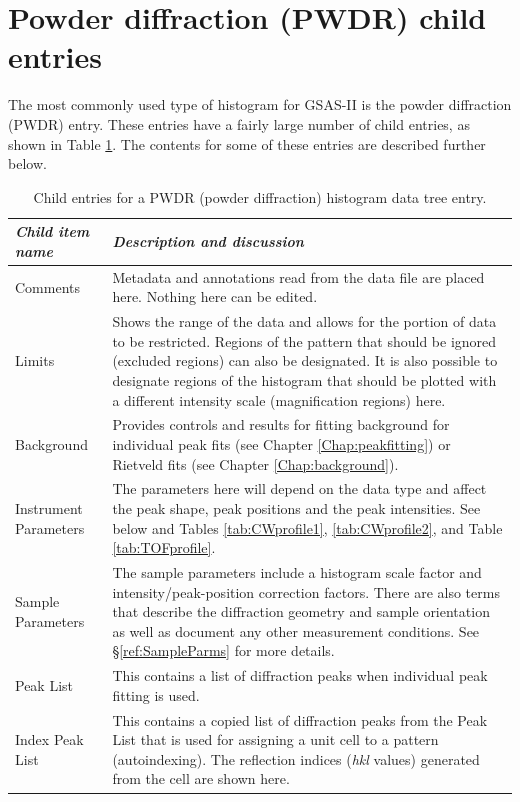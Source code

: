 \clearpage
\section{Powder diffraction (PWDR) child entries}
\label{ref:PWDRchild}
The most commonly used type of histogram for GSAS-II is the powder diffraction (PWDR) entry. 
These entries have a fairly large number of 
child entries, as shown in Table \ref{tab:PWDRchild}. The contents for some of these entries are 
described further below. 

\begin{table}
\centering
\caption{Child entries for a PWDR (powder diffraction) histogram data tree entry.}
\label{tab:PWDRchild}
\begin{tabular}{| l | p{} |}
\hline
\textit{Child item name} & \textit{Description and discussion} \\
\hline
Comments & Metadata and annotations read from the data file are placed here. Nothing here can be edited.\\
\hline
Limits & Shows the range of the data and allows for the portion of data to be restricted. Regions of the pattern that should be ignored (excluded regions) can also be designated. It is also possible to designate regions of the histogram that should be plotted with a different intensity scale (magnification regions) here.\\
\hline
Background & Provides controls and results for fitting background for individual peak fits (see Chapter 
\ref{Chap:peakfitting}) or Rietveld fits (see Chapter 
\ref{Chap:background}). \\
\hline
Instrument Parameters & The parameters here will depend on the data type and affect the peak shape, peak positions and the peak intensities. See below and Tables \ref{tab:CWprofile1}, \ref{tab:CWprofile2}, and Table \ref{tab:TOFprofile}.\\
\hline
Sample Parameters & The sample parameters include a histogram scale factor and intensity/peak-position correction factors. There are also terms that describe the diffraction geometry and sample orientation as well as document any other measurement conditions. See \S\ref{ref:SampleParms} for more details. \\
\hline
Peak List & This contains a list of diffraction peaks when individual peak fitting is used.\\
\hline
Index Peak List & This contains a copied list of diffraction peaks from the Peak List that is used for assigning a unit cell to a pattern (autoindexing). The reflection indices (\textit{hkl} values) generated from the cell are shown here.\\

\end{tabular}
\end{table}
